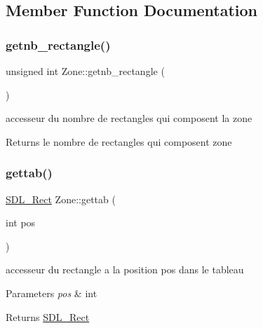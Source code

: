 \subsection{Member Function Documentation}
\mbox{\label{class_zone_a3b912f09ced97f72f772b82934ea298a}} 
\subsubsection{\texorpdfstring{getnb\+\_\+rectangle()}{getnb\_rectangle()}}
{\footnotesize\ttfamily unsigned int Zone\+::getnb\+\_\+rectangle (\begin{DoxyParamCaption}{ }\end{DoxyParamCaption})}



accesseur du nombre de rectangles qui composent la zone 

\begin{DoxyReturn}{Returns}
le nombre de rectangles qui composent zone 
\end{DoxyReturn}
\mbox{\label{class_zone_aa040a486aee97a63701e15b185c5b91f}} 
\subsubsection{\texorpdfstring{gettab()}{gettab()}}
{\footnotesize\ttfamily \hyperlink{struct_s_d_l___rect}{S\+D\+L\+\_\+\+Rect} Zone\+::gettab (\begin{DoxyParamCaption}\item[{int}]{pos }\end{DoxyParamCaption})}



accesseur du rectangle a la position pos dans le tableau 


\begin{DoxyParams}{Parameters}
{\em pos} & int \\
\hline
\end{DoxyParams}
\begin{DoxyReturn}{Returns}
\hyperlink{struct_s_d_l___rect}{S\+D\+L\+\_\+\+Rect} 
\end{DoxyReturn}
\mbox{\label{class_zone_a187bd444ec09f9ec44a86456c5b84611}} 
